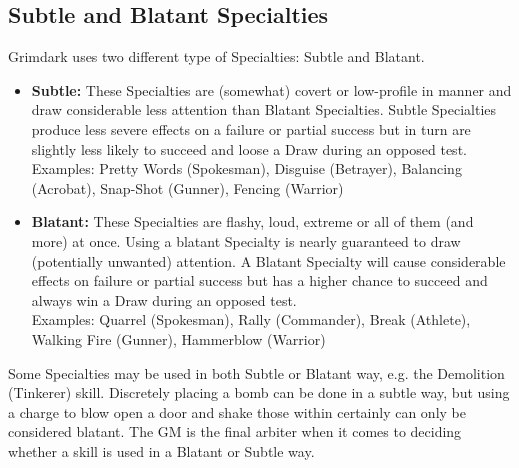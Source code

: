 \subsection{Subtle and Blatant Specialties}
\label{skill_types}
Grimdark uses two different type of Specialties: Subtle and Blatant.
\begin{itemize}
	\item \textbf{Subtle:} These Specialties are (somewhat) covert or low-profile in manner and draw considerable less attention than Blatant Specialties. 
	Subtle Specialties produce less severe effects on a failure or partial success but in turn are slightly less likely to succeed and loose a Draw during an opposed test.\\
	Examples: Pretty Words (Spokesman), Disguise (Betrayer), Balancing (Acrobat), Snap-Shot (Gunner), Fencing (Warrior)

	\item \textbf{Blatant:} These Specialties are flashy, loud, extreme or all of them (and more) at once. 
	Using a blatant Specialty is nearly guaranteed to draw (potentially unwanted) attention.
	A Blatant Specialty will cause considerable effects on failure or partial success but has a higher chance to succeed and always win a Draw during an opposed test.\\
	Examples: Quarrel (Spokesman), Rally (Commander), Break (Athlete), Walking Fire (Gunner), Hammerblow (Warrior)
\end{itemize}
Some Specialties may be used in both Subtle or Blatant way, e.g. the Demolition (Tinkerer) skill. 
Discretely placing a bomb can be done in a subtle way, but using a charge to blow open a door and shake those within certainly can only be considered blatant.
The GM is the final arbiter when it comes to deciding whether a skill is used in a Blatant or Subtle way.

\onecolumn
